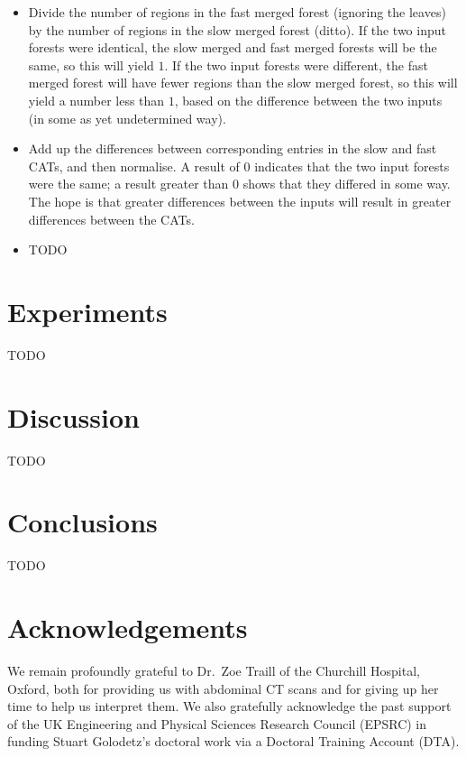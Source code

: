 \documentclass[10pt,twocolumn,twoside]{IEEEtran}
\begin{document}
\begin{itemize}
\item Divide the number of regions in the fast merged forest (ignoring the leaves) by the number of regions in the slow merged forest (ditto). If the two input forests were identical, the slow merged and fast merged forests will be the same, so this will yield $1$. If the two input forests were different, the fast merged forest will have fewer regions than the slow merged forest, so this will yield a number less than $1$, based on the difference between the two inputs (in some as yet undetermined way).
\item Add up the differences between corresponding entries in the slow and fast CATs, and then normalise. A result of $0$ indicates that the two input forests were the same; a result greater than $0$ shows that they differed in some way. The hope is that greater differences between the inputs will result in greater differences between the CATs.
\item TODO
\end{itemize}

\section{Experiments}
\label{sec:experiments}

TODO

\section{Discussion}
\label{sec:discussion}

TODO

\section{Conclusions}
\label{sec:conclusions}

TODO

\section{Acknowledgements}

We remain profoundly grateful to Dr.\ Zoe Traill of the Churchill Hospital, Oxford, both for providing us with abdominal CT scans and for giving up her time to help us interpret them. We also gratefully acknowledge the past support of the UK Engineering and Physical Sciences Research Council (EPSRC) in funding Stuart Golodetz's doctoral work via a Doctoral Training Account (DTA).
\end{document}
